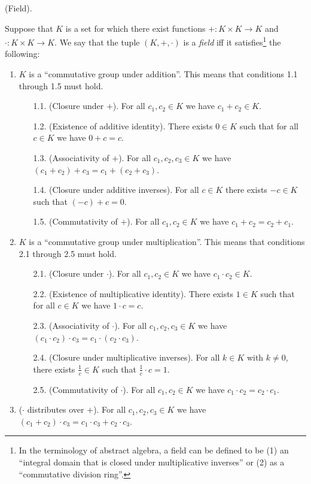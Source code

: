 \begin{defn}
    (Field). 
    
    Suppose that $K$ is a set for which there exist functions $+:K \times K \rightarrow K$ and $\cdot:K \times K \rightarrow K$. We say that the tuple $(K, +, \cdot)$ is a \textit{field} iff it satisfies\footnote{In the terminology of abstract algebra, a field can be defined to be (1) an ``integral domain that is closed under multiplicative inverses'' or (2) as a ``commutative division ring''.} the following:

    \begin{enumerate}
        \item $K$ is a ``commutative group under addition''. This means that conditions 1.1 through 1.5 must hold.
        \begin{enumerate}
            \item[1.1.] (Closure under $+$). For all $c_1, c_2 \in K$ we have $c_1 + c_2 \in K$.
            \item[1.2.] (Existence of additive identity). There exists $0 \in K$ such that for all $c \in K$ we have $0 + c = c$.
            \item[1.3.] (Associativity of $+$). For all $c_1, c_2, c_3 \in K$ we have $(c_1 + c_2) + c_3 = c_1 + (c_2 + c_3)$.
            \item[1.4.] (Closure under additive inverses). For all $c \in K$ there exists $-c \in K$ such that $(-c) + c = 0$.
            \item[1.5.] (Commutativity of $+$). For all $c_1, c_2 \in K$ we have $c_1 + c_2 = c_2 + c_1$.
        \end{enumerate}
        \item $K$ is a ``commutative group under multiplication''. This means that conditions 2.1 through 2.5 must hold.
        \begin{enumerate}
            \item[2.1.] (Closure under $\cdot$). For all $c_1, c_2 \in K$ we have $c_1 \cdot c_2 \in K$.
            \item[2.2.] (Existence of multiplicative identity). There exists $1 \in K$ such that for all $c \in K$ we have $1 \cdot c = c$.
            \item[2.3.] (Associativity of $\cdot$). For all $c_1, c_2, c_3 \in K$ we have $(c_1 \cdot c_2) \cdot c_3 = c_1 \cdot (c_2 \cdot c_3)$.
            \item[2.4.] (Closure under multiplicative inverses). For all $k \in K$ with $k \neq 0$, there exists $\frac{1}{c} \in K$ such that $\frac{1}{c} \cdot c = 1$.
            \item[2.5.] (Commutativity of $\cdot$). For all $c_1, c_2 \in K$ we have $c_1 \cdot c_2 = c_2 \cdot c_1$.
        \end{enumerate}
        \item ($\cdot$ distributes over $+$). For all $c_1, c_2, c_3 \in K$ we have $(c_1 + c_2) \cdot c_3 = c_1 \cdot c_3 + c_2 \cdot c_3$.
    \end{enumerate} 


\end{defn}
